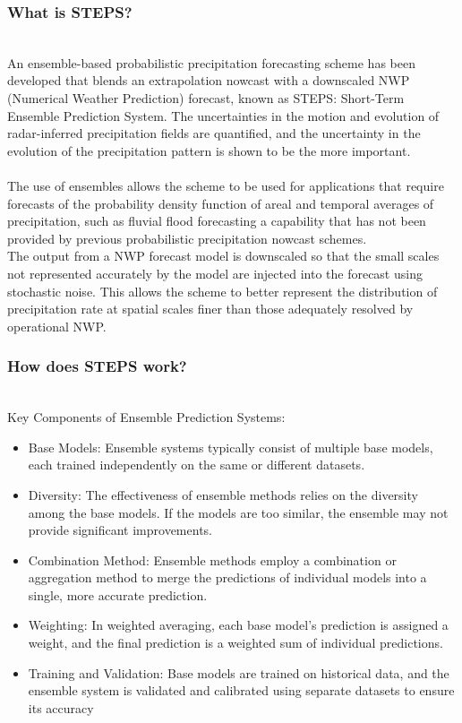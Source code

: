 \documentclass[../paper.tex]{subfiles}
\begin{document}
    \subsubsection{What is STEPS?}
        \hfill\\
        An ensemble-based probabilistic precipitation forecasting scheme has been developed that blends an extrapolation nowcast with a downscaled NWP
        (Numerical Weather Prediction) forecast, known as STEPS: Short-Term Ensemble Prediction System.
        The uncertainties in the motion and evolution of radar-inferred precipitation fields are quantified,
        and the uncertainty in the evolution of the precipitation pattern is shown to be the more important. \\\\
        The use of ensembles allows the scheme to be used for applications
        that require forecasts of the probability density function of areal and temporal averages of precipitation, such as fluvial flood forecasting a capability
        that has not been provided by previous probabilistic precipitation nowcast schemes. \\
        The output from a NWP forecast model is downscaled so that the small scales not represented accurately by the model are injected into the forecast using stochastic noise.
        This allows the scheme to better represent the distribution of precipitation rate at spatial scales finer than those adequately resolved by operational NWP\@.
    \subsubsection{How does STEPS work?}
        \hfill\\
        Key Components of Ensemble Prediction Systems:
        \begin{itemize}
            \item Base Models: Ensemble systems typically consist of multiple base models,
            each trained independently on the same or different datasets.

            \item Diversity: The effectiveness of ensemble methods relies on the diversity among the base models.
            If the models are too similar, the ensemble may not provide significant improvements.

            \item Combination Method:
            Ensemble methods employ a combination or aggregation method
            to merge the predictions of individual models into a single,
            more accurate prediction.

            \item Weighting: In weighted averaging, each base model's prediction is assigned a weight,
            and the final prediction is a weighted sum of individual predictions.

            \item Training and Validation: Base models are trained on historical data,
            and the ensemble system is validated and calibrated
            using separate datasets to ensure its accuracy
        \end{itemize}
\end{document}
